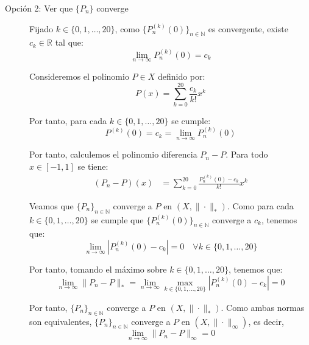 \documentclass[12pt]{article}
\begin{document}
\begin{ejercicio}[3 puntos]
\begin{description}
            \item[Opción 2: Ver que $\{P_n\}$ converge]
            
            Fijado $k\in\{0,1,\ldots,20\}$, como $\{P_n^{(k)}(0)\}_{n\in \mathbb{N}}$ es convergente, existe $c_k\in \mathbb{R}$ tal que:
            \begin{equation*}
                \lim_{n\to\infty} P_n^{(k)}(0) = c_k
            \end{equation*}

            Consideremos el polinomio $P\in X$ definido por:
            \begin{equation*}
                P(x) = \sum_{k=0}^{20} \frac{c_k}{k!} x^k
            \end{equation*}

            Por tanto, para cada $k\in\{0,1,\ldots,20\}$ se cumple:
            \begin{equation*}
                P^{(k)}(0) = c_k = \lim_{n\to\infty} P_n^{(k)}(0)
            \end{equation*}

            Por tanto, calculemos el polinomio diferencia $P_n-P$. Para todo $x\in[-1,1]$ se tiene:
            \begin{align*}
                (P_n-P)(x) &= \sum_{k=0}^{20} \frac{P_n^{(k)}(0)-c_k}{k!} x^k
            \end{align*}
            
            Veamos que $\{P_n\}_{n\in \mathbb{N}}$ converge a $P$ en $\left(X,\|\cdot\|_*\right)$. Como para cada $k\in\{0,1,\ldots,20\}$ se cumple que $\{P_n^{(k)}(0)\}_{n\in \mathbb{N}}$ converge a $c_k$, tenemos que:
            \begin{equation*}
                \lim_{n\to\infty} |P_n^{(k)}(0)-c_k| = 0 \quad \forall k\in\{0,1,\ldots,20\}
            \end{equation*}

            Por tanto, tomando el máximo sobre $k\in\{0,1,\ldots,20\}$, tenemos que:
            \begin{equation*}
                \lim_{n\to\infty} \|P_n-P\|_* = \lim_{n\to\infty} \max_{k\in\{0,1,\ldots,20\}} |P_n^{(k)}(0)-c_k| = 0
            \end{equation*}

            Por tanto, $\{P_n\}_{n\in \mathbb{N}}$ converge a $P$ en $\left(X,\|\cdot\|_*\right)$. Como ambas normas son equivalentes, $\{P_n\}_{n\in \mathbb{N}}$ converge a $P$ en $\left(X,\|\cdot\|_\infty\right)$, es decir,
            \begin{equation*}
                \lim_{n\to\infty} \|P_n-P\|_\infty = 0
            \end{equation*}
        \end{description}


\end{ejercicio}
\end{document}
